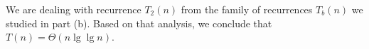 We are dealing with recurrence $T_2(n)$ from the family of recurrences $T_b(n)$ we studied in part (b).
Based on that analysis, we conclude that $T(n)=\Theta(n\lg\lg n)$.
